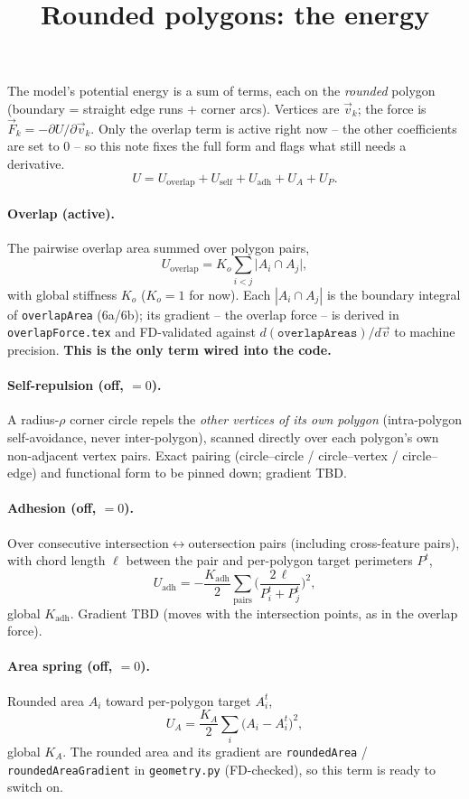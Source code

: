 \documentclass[11pt]{article}
\title{Rounded polygons: the energy}
\date{}
\author{}
\newcommand{\vv}[1]{\vec{#1}}
\begin{document}
\maketitle

The model's potential energy is a sum of terms, each on the \emph{rounded} polygon (boundary =
straight edge runs $+$ corner arcs). Vertices are $\vv v_k$; the force is $\vv F_k=-\partial
U/\partial\vv v_k$. Only the overlap term is active right now -- the other coefficients are set to
$0$ -- so this note fixes the full form and flags what still needs a derivative.
\[
  U=U_{\mathrm{overlap}}+U_{\mathrm{self}}+U_{\mathrm{adh}}+U_{A}+U_{P}.
\]

\paragraph{Overlap (active).} The pairwise overlap area summed over polygon pairs,
\[
  U_{\mathrm{overlap}}=K_{o}\sum_{i<j}\big|A_i\cap A_j\big|,
\]
with global stiffness $K_{o}$ ($K_o=1$ for now). Each $|A_i\cap A_j|$ is the boundary integral of
\texttt{overlapArea} (6a/6b); its gradient -- the overlap force -- is derived in
\texttt{overlapForce.tex} and FD-validated against $d(\texttt{overlapAreas})/d\vv v$ to machine
precision. \textbf{This is the only term wired into the code.}

\paragraph{Self-repulsion (off, $=0$).} A radius-$\rho$ corner circle repels the \emph{other
vertices of its own polygon} (intra-polygon self-avoidance, never inter-polygon), scanned directly
over each polygon's own non-adjacent vertex pairs. Exact pairing (circle--circle / circle--vertex /
circle--edge) and functional form to be pinned down; gradient TBD.

\paragraph{Adhesion (off, $=0$).} Over consecutive intersection$\leftrightarrow$outersection
pairs (including cross-feature pairs), with chord length $\ell$ between the pair and per-polygon
target perimeters $P^{t}$,
\[
  U_{\mathrm{adh}}=-\frac{K_{\mathrm{adh}}}{2}\sum_{\text{pairs}}\Big(\frac{2\,\ell}{P^{t}_i+P^{t}_j}\Big)^{2},
\]
global $K_{\mathrm{adh}}$. Gradient TBD (moves with the intersection points, as in the overlap
force).

\paragraph{Area spring (off, $=0$).} Rounded area $A_i$ toward per-polygon target $A^{t}_i$,
\[
  U_{A}=\frac{K_{A}}{2}\sum_i\big(A_i-A^{t}_i\big)^2,
\]
global $K_{A}$. The rounded area and its gradient are \texttt{roundedArea} /
\texttt{roundedAreaGradient} in \texttt{geometry.py} (FD-checked), so this term is ready to switch
on.
\end{document}
